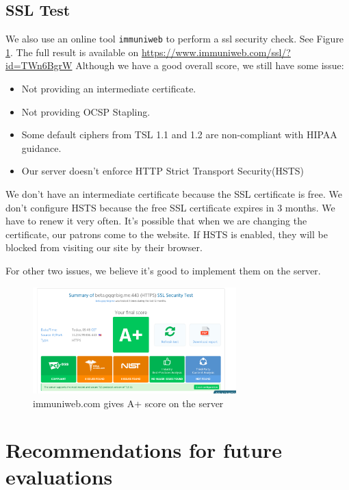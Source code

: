 \documentclass[12pt, a4paper]{article}
\newcommand{\code}[1]{\texttt{#1}}
\begin{document}
\subsection{SSL Test}
We also use an online tool \code{immuniweb} to perform a ssl security check. See Figure \ref{fig:immuniweb}. The full result is available on \url{https://www.immuniweb.com/ssl/?id=TWn6BgrW} Although we have a good overall score, we still have some issue:

\begin{itemize}
    \item Not providing an intermediate certificate.
    \item Not providing OCSP Stapling.
    \item Some default ciphers from TSL 1.1 and 1.2 are non-compliant with HIPAA guidance.
    \item Our server doesn't enforce HTTP Strict Transport Security(HSTS)
\end{itemize}

We don't have an intermediate certificate because the SSL certificate is free. We don't configure HSTS because the free SSL certificate expires in 3 months. We have to renew it very often. It's possible that when we are changing the certificate, our patrons come to the website. If HSTS is enabled, they will be blocked from visiting our site by their browser. 

For other two issues, we believe it's good to implement them on the server.


\begin{figure}[ht]
\centering
\includegraphics[width=0.7\textwidth]{immuniweb.png}
\caption{immuniweb.com gives A+ score on the server}
\label{fig:immuniweb}
\end{figure}





\section{Recommendations for future evaluations}
\end{document}
